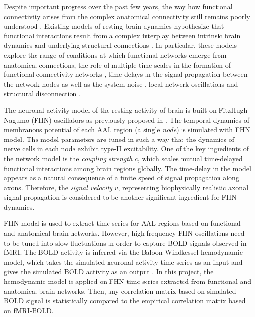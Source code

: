 Despite important progress over the past few years, the way how functional connectivity arises from the complex anatomical connectivity still remains poorly understood \citep{VUK14}. Existing models of resting-brain dynamics hypothesize that functional interactions result from a complex interplay between intrinsic brain dynamics and underlying structural connections \citep{RUB09}. In particular, these models explore the range of conditions at which functional networks emerge from anatomical connections, the role of multiple time-scales in the formation of functional connectivity networks \citep{HON07}, time delays in the signal propagation between the network nodes as well as the system noise \citep{GHO08, GHO08a}, local network oscillations \citep{DEC09, CAB11} and structural disconnection \citep{CAB12}.

The neuronal activity model of the resting activity of brain is built on FitzHugh-Nagumo (FHN) oscillators as  previously proposed in \citep{VUK13, VUK14}. The temporal dynamics of membranous potential of each AAL region (a single \textit{node}) is simulated with FHN model. The model parameters are tuned in such a way that the dynamics of nerve cells in each node exhibit type-II excitability. One of the key ingredients of the network model is the \textit{coupling strength} $c$, which scales mutual time-delayed functional interactions among brain regions globally. The time-delay in the model appears as a natural consequence of a finite speed of signal propagation along axons. Therefore, the \textit{signal velocity} $v$, representing biophysically realistic axonal signal propagation \citep{GHO08, GHO08a, DEC09} is considered to be another significant ingredient for FHN dynamics. 

FHN model is used to extract time-series for AAL regions based on functional and anatomical brain networks. However, high frequency FHN oscillations need to be tuned into slow fluctuations in order to capture BOLD signals observed in fMRI. The BOLD activity is inferred via the Baloon-Windkessel hemodynamic model, which takes the simulated neuronal activity time-series as an input and gives the simulated BOLD activity as an output \citep{FRI00}. In this project, the hemodynamic model is applied on FHN time-series extracted from functional and anatomical brain networks. Then, any correlation matrix based on simulated BOLD signal is statistically compared to the empirical correlation matrix based on fMRI-BOLD.      

